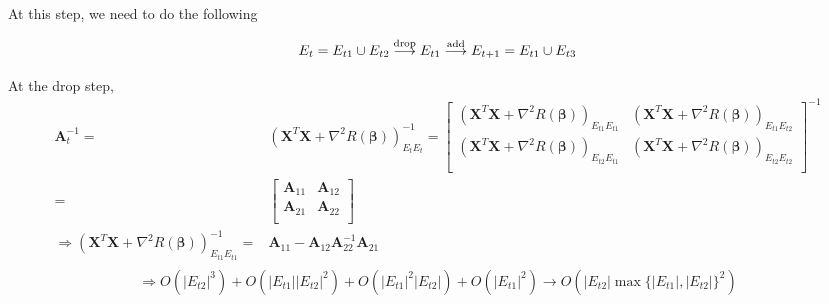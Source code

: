 \documentclass[letter]{article}
\begin{document}
	At this step, we need to do the following
	
	$$E_t=E_{t1}\cup E_{t2}\overset{{\rm drop}}{\longrightarrow}E_{t1}\overset{{\rm add}}{\longrightarrow}E_{t+1}=E_{t1}\cup E_{t3}$$
	
	At the drop step,
	$$\begin{aligned}
	\bm{A}_t^{-1}
	=&\left(\bm{X}^T\bm{X}+\nabla^2R(\bm{\beta})\right)_{E_{t}E_{t}}^{-1}
	=\begin{bmatrix}
	\left(\bm{X}^T\bm{X}+\nabla^2R(\bm{\beta})\right)_{E_{t1}E_{t1}} & 
	\left(\bm{X}^T\bm{X}+\nabla^2R(\bm{\beta})\right)_{E_{t1}E_{t2}} \\
	\left(\bm{X}^T\bm{X}+\nabla^2R(\bm{\beta})\right)_{E_{t2}E_{t1}} & 
	\left(\bm{X}^T\bm{X}+\nabla^2R(\bm{\beta})\right)_{E_{t2}E_{t2}} \\
	\end{bmatrix}^{-1} \\
	=&\begin{bmatrix}
	\bm{A}_{11} & \bm{A}_{12} \\
	\bm{A}_{21} & \bm{A}_{22} \\
	\end{bmatrix} \\
	\Rightarrow  \left(\bm{X}^T\bm{X}+\nabla^2R(\bm{\beta})\right)_{E_{t1}E_{t1}}^{-1}=&\bm{A}_{11}-\bm{A}_{12}\bm{A}_{22}^{-1}\bm{A}_{21} \\
	\end{aligned}$$
	$$\Rightarrow O(|E_{t2}|^3)+O(|E_{t1}| |E_{t2}|^2)+O(|E_{t1}|^2|E_{t2}|)+O(|E_{t1}|^2)
	\rightarrow O(|E_{t2}|\max\{|E_{t1}|,|E_{t2}|\}^2)$$
	
\end{document}
